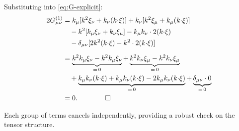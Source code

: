 \documentclass[11pt,a4paper]{article}
\theoremstyle{plain}
\theoremstyle{definition}
\begin{document}
Substituting into \cref{eq:G-explicit}:
\begin{align}
  2G^{(1)}_{\mu\nu}
  &= k_\mu[k^2\xi_\nu + k_\nu(k{\cdot}\xi)]
  + k_\nu[k^2\xi_\mu + k_\mu(k{\cdot}\xi)]\notag\\
  &\quad - k^2[k_\mu\xi_\nu + k_\nu\xi_\mu]
  - k_\mu k_\nu \cdot 2(k{\cdot}\xi)\notag\\
  &\quad - \delta_{\mu\nu}[2k^2(k{\cdot}\xi) - k^2 \cdot 2(k{\cdot}\xi)]
  \notag\\[6pt]
  &= \underbrace{k^2 k_\mu\xi_\nu - k^2 k_\mu\xi_\nu}_{=\,0}
  + \underbrace{k^2 k_\nu\xi_\mu - k^2 k_\nu\xi_\mu}_{=\,0}\notag\\
  &\quad + \underbrace{k_\mu k_\nu(k{\cdot}\xi)
  + k_\mu k_\nu(k{\cdot}\xi)
  - 2k_\mu k_\nu(k{\cdot}\xi)}_{=\,0}
  + \underbrace{\delta_{\mu\nu} \cdot 0}_{=\,0}\notag\\
  &= 0.\qquad\qed
\end{align}

Each group of terms cancels independently, providing a robust check
on the tensor structure.
\end{document}
